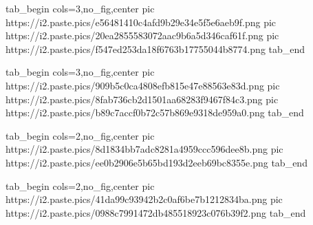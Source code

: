  
 
 
 
 
\zzSecCmtScr

\ifcmt
  tab_begin cols=3,no_fig,center
     pic https://i2.paste.pics/e56481410c4afd9b29e34e5f5e6aeb9f.png
		 pic https://i2.paste.pics/20ea2855583072aac9b6a5d346caf61f.png
		 pic https://i2.paste.pics/f547ed253da18f6763b17755044b8774.png
  tab_end
\fi

\ifcmt
  tab_begin cols=3,no_fig,center
	   pic https://i2.paste.pics/909b5c0ca4808efb815e47e88563e83d.png
		 pic https://i2.paste.pics/8fab736cb2d1501aa68283f9467f84c3.png
		 pic https://i2.paste.pics/b89c7accf0b72c57b869e9318de959a0.png
  tab_end
\fi

\ifcmt
  tab_begin cols=2,no_fig,center
	   pic https://i2.paste.pics/8d1834bb7adc8281a4959ccc596dee8b.png
		 pic https://i2.paste.pics/ee0b2906e5b65bd193d2eeb69bc8355e.png
  tab_end
\fi

\ifcmt
  tab_begin cols=2,no_fig,center
	   pic https://i2.paste.pics/41da99c93942b2c0af6be7b1212834ba.png
		 pic https://i2.paste.pics/0988c7991472db485518923c076b39f2.png
  tab_end
\fi
